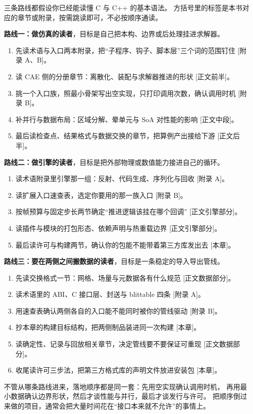 \documentclass[12pt,a4paper,fontset=fandol]{ctexbook}
\newcommand{\Lang}[1]{\textsf{#1}}
\newcommand{\CL}{\Lang{C}}
\newcommand{\CPP}{\Lang{C++}}
\newcommand{\DomCAE}{\Lang{CAE}}
\begin{document}
三条路线都假设你已经能读懂 \CL{} 与 \CPP{} 的基本语法。
方括号里的标签是本书对应的章节或附录，按需跳读即可，不必按顺序通读。

\textbf{路线一：做仿真的读者}，目标是自己把本构、边界或后处理挂进求解器。

\begin{enumerate}
\item 先读术语与入口两本附录，把``子程序、钩子、脚本层''三个词的范围钉住 [附录 A、B]。
\item 读 \DomCAE{} 侧的分册章节：离散化、装配与求解器推进的形状 [正文前半]。
\item 挑一个入口族，照最小骨架写出空实现，只打印调用次数，确认调用时机 [附录 B]。
\item 补并行与数据布局：区域分解、晕单元与 SoA 对性能的影响 [正文中段]。
\item 最后读检查点、结果格式与数据交换的章节，把算例产出接给下游 [正文后半]。
\end{enumerate}

\textbf{路线二：做引擎的读者}，目标是把外部物理或数值能力接进自己的循环。

\begin{enumerate}
\item 读术语附录里引擎那一组：反射、代码生成、序列化与回收 [附录 A]。
\item 读扩展入口速查表，选定你要用的那一族入口 [附录 B]。
\item 按帧预算与固定步长两节确定``推进逻辑该挂在哪个回调'' [正文引擎部分]。
\item 读插件与模块的打包形态、依赖声明与热重载边界 [正文引擎部分]。
\item 最后读许可与构建两节，确认你的包能不能带着第三方库发出去 [本章]。
\end{enumerate}

\textbf{路线三：要在两侧之间搬数据的读者}，目标是一条稳定的导入导出管线。

\begin{enumerate}
\item 先读交换格式一节：网格、场量与元数据各有什么规范 [正文数据部分]。
\item 读术语里的 ABI、C 接口层、封送与 blittable 四条 [附录 A]。
\item 用速查表确认两侧各自的入口能不能同时被你的管线驱动 [附录 B]。
\item 抄本章的构建目标结构，把两侧制品装进同一次构建 [本章]。
\item 读确定性、记录与回放相关章节，决定管线要不要保证可重现 [正文数据部分]。
\item 收尾读许可三步法，把第三方格式库的声明文件放进安装包 [本章]。
\end{enumerate}

\begin{guideline}[title={三条路线共用的落地顺序}]
不管从哪条路线进来，落地顺序都是同一套：先用空实现确认调用时机，
再用最小数据确认边界形状，然后才谈性能与并行，最后才谈发行与许可。
把顺序倒过来做的项目，通常会把大量时间花在``接口本来就不允许''的事情上。
\end{guideline}
\end{document}
